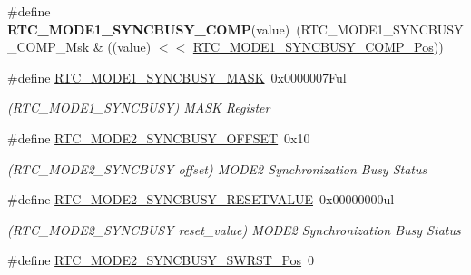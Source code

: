 \begin{DoxyCompactItemize}
\item 
\hypertarget{group___s_a_m_l21___r_t_c_ga517bad7ef906d8a0649c282682ea9736}{}\#define {\bfseries R\+T\+C\+\_\+\+M\+O\+D\+E1\+\_\+\+S\+Y\+N\+C\+B\+U\+S\+Y\+\_\+\+C\+O\+M\+P}(value)~(R\+T\+C\+\_\+\+M\+O\+D\+E1\+\_\+\+S\+Y\+N\+C\+B\+U\+S\+Y\+\_\+\+C\+O\+M\+P\+\_\+\+Msk \& ((value) $<$$<$ \hyperlink{group___s_a_m_l21___r_t_c_gacb6687afbd8536b9e2c06ad518621a2e}{R\+T\+C\+\_\+\+M\+O\+D\+E1\+\_\+\+S\+Y\+N\+C\+B\+U\+S\+Y\+\_\+\+C\+O\+M\+P\+\_\+\+Pos}))\label{group___s_a_m_l21___r_t_c_ga517bad7ef906d8a0649c282682ea9736}

\item 
\hypertarget{group___s_a_m_l21___r_t_c_gaa7e32903e28d5fc674892ae40201ace5}{}\#define \hyperlink{group___s_a_m_l21___r_t_c_gaa7e32903e28d5fc674892ae40201ace5}{R\+T\+C\+\_\+\+M\+O\+D\+E1\+\_\+\+S\+Y\+N\+C\+B\+U\+S\+Y\+\_\+\+M\+A\+S\+K}~0x0000007\+Ful\label{group___s_a_m_l21___r_t_c_gaa7e32903e28d5fc674892ae40201ace5}

\begin{DoxyCompactList}\small\item\em (R\+T\+C\+\_\+\+M\+O\+D\+E1\+\_\+\+S\+Y\+N\+C\+B\+U\+S\+Y) M\+A\+S\+K Register \end{DoxyCompactList}\item 
\hypertarget{group___s_a_m_l21___r_t_c_gad92fdb57a05d4b4d18aa6a5479f2e95e}{}\#define \hyperlink{group___s_a_m_l21___r_t_c_gad92fdb57a05d4b4d18aa6a5479f2e95e}{R\+T\+C\+\_\+\+M\+O\+D\+E2\+\_\+\+S\+Y\+N\+C\+B\+U\+S\+Y\+\_\+\+O\+F\+F\+S\+E\+T}~0x10\label{group___s_a_m_l21___r_t_c_gad92fdb57a05d4b4d18aa6a5479f2e95e}

\begin{DoxyCompactList}\small\item\em (R\+T\+C\+\_\+\+M\+O\+D\+E2\+\_\+\+S\+Y\+N\+C\+B\+U\+S\+Y offset) M\+O\+D\+E2 Synchronization Busy Status \end{DoxyCompactList}\item 
\hypertarget{group___s_a_m_l21___r_t_c_gaac27b41c2c9b4c5c663117aecb47c1d4}{}\#define \hyperlink{group___s_a_m_l21___r_t_c_gaac27b41c2c9b4c5c663117aecb47c1d4}{R\+T\+C\+\_\+\+M\+O\+D\+E2\+\_\+\+S\+Y\+N\+C\+B\+U\+S\+Y\+\_\+\+R\+E\+S\+E\+T\+V\+A\+L\+U\+E}~0x00000000ul\label{group___s_a_m_l21___r_t_c_gaac27b41c2c9b4c5c663117aecb47c1d4}

\begin{DoxyCompactList}\small\item\em (R\+T\+C\+\_\+\+M\+O\+D\+E2\+\_\+\+S\+Y\+N\+C\+B\+U\+S\+Y reset\+\_\+value) M\+O\+D\+E2 Synchronization Busy Status \end{DoxyCompactList}\item 
\hypertarget{group___s_a_m_l21___r_t_c_ga9adf64c5f65b990565a8a77130d60925}{}\#define \hyperlink{group___s_a_m_l21___r_t_c_ga9adf64c5f65b990565a8a77130d60925}{R\+T\+C\+\_\+\+M\+O\+D\+E2\+\_\+\+S\+Y\+N\+C\+B\+U\+S\+Y\+\_\+\+S\+W\+R\+S\+T\+\_\+\+Pos}~0\label{group___s_a_m_l21___r_t_c_ga9adf64c5f65b990565a8a77130d60925}


\end{DoxyCompactItemize}
